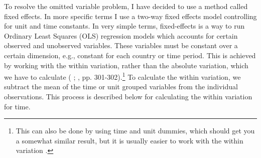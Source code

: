 To resolve the omitted variable problem, I have decided to use a method called fixed effects. In more specific terms I use a two-way fixed effects model controlling for unit and time constants. In very simple terms, fixed-effects is a way to run Ordinary Least Squares (OLS) regression models which accounts for certain observed and unobserved variables. These variables must be constant over a certain dimension, e.g., constant for each country or time period. This is achieved by working with the within variation, rather than the absolute variation, which we have to calculate (\citeauthor{huntington-klein_effect_2022} \citeyear{huntington-klein_effect_2022}; \citeauthor{wooldridge_econometric_2010} \citeyear{wooldridge_econometric_2010}, pp. 301-302).\footnote{This can also be done by using time and unit dummies, which should get you a somewhat similar result, but it is usually easier to work with the within variation \citep{huntington-klein_effect_2022}.} To calculate the within variation, we subtract the mean of the time or unit grouped variables from the individual observations. This process is described below for calculating the within variation for time. 

